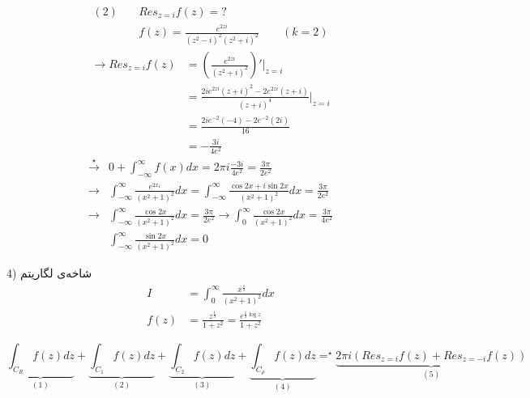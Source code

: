 \begin{equation*}
	\begin{split}
		(2) \quad &Res_{z=i}f(z) =? \\
&f(z)=\frac{e^{2zi}}{( z^{2}-i)^{2}( z^{2}+i)^{2}} \quad \quad(k=2)
	\end{split}
\end{equation*}
\begin{align*}
	\rightarrow Res_{z=i}f(z) &=(\frac{e^{2zi}}{( z^{2}+i)^{2}})'|_{z=i}\\
	&=\frac{2i e^{2zi}(z+i)^{2}-2e^{2zi}(z+i)}{(z+i)^{4}}|_{z=i} \\
	&=\frac{2i e^{-2}(-4)-2e^{-2}(2i)}{16} \\
	&=-\frac{3i}{4e^{2}}
\end{align*}
\begin{align*}
\overset{\star}{\rightarrow} & 0+\int_{-\infty}^{\infty} f(x) d x=2 \pi i \frac{-3 i}{4 e^{2}}=\frac{3 \pi}{2 e^{2}} \\
\rightarrow &\int_{-\infty}^{\infty} \frac{e^{2 x_{1}}}{\left(x^{2}+1\right)^{2}} d x=\int_{-\infty}^{\infty} \frac{\cos 2 x+i \sin 2 x}{\left(x^{2}+1\right)^{2}} d x=\frac{3 \pi}{2 e^{2}} \\
\rightarrow& \int_{-\infty}^{\infty} \frac{\cos 2 x}{\left(x^{2}+1\right)^{2}} d x=\frac{3 \pi}{2 e^{2}}\rightarrow  \int_{0}^{\infty} \frac{\cos 2 x}{\left(x^{2}+1\right)^{2}} d x=\frac{3 \pi}{4 e^{2}} \\
	&\int_{-\infty}^{\infty} \frac{\sin 2 x}{\left(x^{2}+1\right)^{2}} d x=0
\end{align*}

\par{4) شاخه‌ی لگاریتم}
\begin{equation*}
\begin{split}
I&=  \int_{0}^{\infty} \frac{x^{\frac{1}{3}}}{\left(x^{2}+1\right)^{2}} d x \\
f(z)&=\frac{z^{\frac{1}{3}}}{ 1+z^{2}}=\frac{e^{\frac{1}{3} \log z}}{ 1+z^{2}}
\end{split}
\end{equation*}

\begin{equation*}
\underbrace{
	\int_{C_{R}}f(z)dz}_{(1)}+
\underbrace{\int_{C_{1}}f(z)dz}_{(2)}+
\underbrace{\int_{C_{2}}f(z)dz}_{(3)}+
\underbrace{\int_{C_{\rho}}f(z)dz}_{(4)}
=^{\star} 
\underbrace{2\pi i(Res_{z=i} f(z) +Res_{z=-i}f(z))}_{(5)}
\end{equation*}

